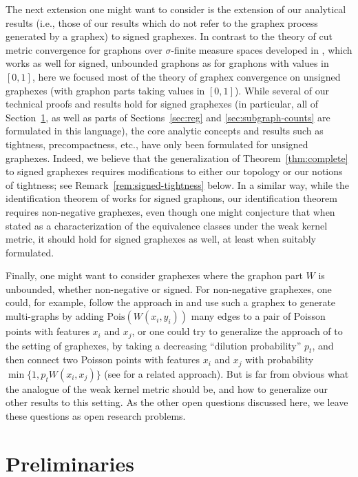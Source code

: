 \documentclass{amsart}
\numberwithin{equation}{section}
\numberwithin{figure}{section}
\theoremstyle{definition}
\theoremstyle{remark}
\begin{document}
The next extension one might want to consider is the extension of our
analytical results (i.e., those of our results which do not refer to the
graphex process generated by a graphex) to signed graphexes. In contrast to
the theory of cut metric convergence for graphons over $\sigma$-finite
measure spaces developed in \cite{BCCH16}, which works as well for signed,
unbounded graphons as for graphons with values in $[0,1]$, here we focused
most of the theory of graphex convergence on unsigned graphexes (with graphon
parts taking values in $[0,1]$). While several of our technical proofs and
results hold for signed graphexes (in particular, all of
Section~\ref{sec:prelim}, as well as parts of Sections~\ref{sec:reg} and
\ref{sec:subgraph-counts} are formulated in this language), the core analytic
concepts and results such as tightness, precompactness, etc., have only been
formulated for unsigned graphexes. Indeed, we believe that the generalization
of Theorem~\ref{thm:complete} to signed graphexes requires modifications to
either our topology or our notions of tightness; see
Remark~\ref{rem:signed-tightness} below. In a similar way, while the
identification theorem of \cite{BCCH16} works for signed graphons, our
identification theorem requires non-negative graphexes, even though one might
conjecture that when stated as a characterization of the equivalence classes
under the weak kernel metric, it should hold for signed graphexes as well, at
least when suitably formulated.

Finally, one might want to consider graphexes where the graphon part $W$ is
unbounded, whether non-negative or signed. For non-negative graphexes, one
could, for example, follow the approach in \cite{BCDS18} and use such a
graphex to generate multi-graphs by adding $\text{Pois}(W(x_i,y_i))$ many
edges to a pair of Poisson points with features $x_i$ and $x_j$, or one could
try to generalize the approach of \cite{LP1} to the setting of graphexes, by
taking a decreasing ``dilution probability'' $p_t$, and then connect two
Poisson points with features $x_i$ and $x_j$ with probability $\min\{1,p_t
W(x_i,x_j)\}$ (see \cite{BCCH2} for a related approach). But is far from
obvious what the analogue of the weak kernel metric should be, and how to
generalize our other results to this setting. As the other open questions
discussed here, we leave these questions as open research problems.

\section{Preliminaries} \label{sec:prelim}
\end{document}
